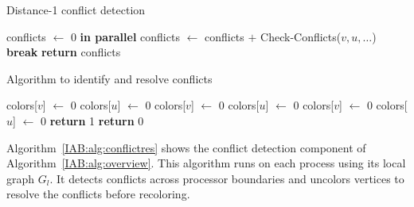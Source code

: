 \begin{algorithm}[!htb]
\algrenewcommand\algorithmicindent{1.0em}
  \caption{Distance-1 conflict detection}
  \label{IAB:alg:conflictres}
  \begin{algorithmic}
      \State conflicts $\gets$ 0
       \textbf{in parallel}
          \State conflicts $\gets$ conflicts $+$ Check-Conflicts($v,u,\ldots$)
	    \State \textbf{break}
	  \EndIf
        \EndFor
      \EndFor
      \State \textbf{return} conflicts
    \EndProcedure
  \end{algorithmic}
\end{algorithm}

\begin{algorithm}[!htb]
  \caption{Algorithm to identify and resolve conflicts}
  \label{IAB:alg:conflictcheck}
  \begin{algorithmic}
	  \State colors[$v$] $\gets$ 0
	  \State colors[$u$] $\gets$ 0
	  \State colors[$v$] $\gets$ 0
	  \State colors[$u$] $\gets$ 0
	  \State colors[$v$] $\gets$ 0
	\Else
	  \State colors[$u$] $\gets$ 0
	\EndIf
        \State \textbf{return} 1
      \EndIf
      \State \textbf{return} 0
    \EndProcedure
  \end{algorithmic}
\end{algorithm}


Algorithm~\ref{IAB:alg:conflictres} shows the conflict detection component of Algorithm~\ref{IAB:alg:overview}. 
This algorithm runs on each process using its local graph $G_l$.
It detects conflicts across processor boundaries and uncolors vertices to 
resolve the conflicts before recoloring.

